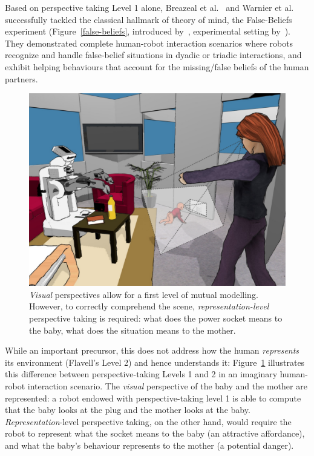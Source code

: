 \documentclass{sig-alternate}
\begin{document}
Based on perspective taking Level 1 alone, Breazeal et
al.~\cite{breazeal2009embodied} and Warnier et al.~\cite{warnier2012when}
successfully tackled the classical hallmark of theory of mind, the
False-Beliefs experiment (Figure~\ref{false-beliefs}, introduced
by~\cite{wimmer1983beliefs}, experimental setting by~\cite{Baron-Cohen1985}).
They demonstrated complete human-robot interaction scenarios where robots
recognize and handle false-belief situations in dyadic or triadic interactions,
and exhibit helping behaviours that account for the missing/false beliefs of the
human partners.


\begin{figure}
        \centering
        \includegraphics[width=0.9\columnwidth]{representation-perspective-taking}
        \caption{\emph{Visual} perspectives allow for a first level of mutual
            modelling. However, to correctly comprehend the scene,
            \emph{representation-level} perspective taking is required: what
            does the power socket means to the baby, what does the situation
            means to the mother.}

        \label{representation-level}
\end{figure}

While an important precursor, this does not address how the human
\emph{represents} its environment (Flavell's Level 2) and hence understands it:
Figure~\ref{representation-level} illustrates this difference between
perspective-taking Levels 1 and 2 in an imaginary human-robot interaction
scenario. The \emph{visual} perspective of the baby and the mother are
represented: a robot endowed with perspective-taking level 1 is able to compute
that the baby looks at the plug and the mother looks at the baby.
\emph{Representation}-level perspective taking, on the other hand, would require
the robot to represent what the socket means to the baby (an attractive
affordance), and what the baby's behaviour represents to the mother (a potential
danger).
\end{document}
